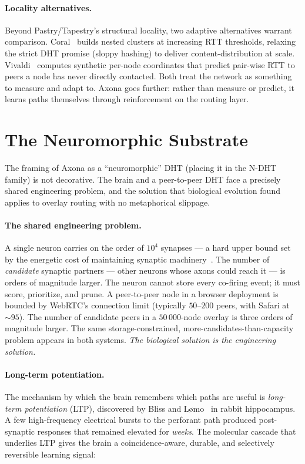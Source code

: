 \documentclass[conference]{IEEEtran}
\newcommand{\axona}{Axona\xspace}
\newcommand{\NDHT}{N-DHT\xspace}
\begin{document}
\paragraph{Locality alternatives.}
Beyond Pastry/Tapestry's structural locality, two adaptive alternatives
warrant comparison. Coral~\cite{freedman2004coral} builds nested clusters
at increasing RTT thresholds, relaxing the strict DHT promise (sloppy
hashing) to deliver content-distribution at scale.
Vivaldi~\cite{dabek2004vivaldi} computes synthetic per-node coordinates
that predict pair-wise RTT to peers a node has never directly contacted.
Both treat the network as something to measure and adapt to. \axona
goes further: rather than measure or predict, it learns paths
themselves through reinforcement on the routing layer.

\section{The Neuromorphic Substrate}
\label{sec:substrate}

The framing of \axona as a ``neuromorphic'' DHT (placing it in the
\NDHT family) is not decorative. The brain and a peer-to-peer DHT face
a precisely shared engineering problem, and the solution that biological
evolution found applies to overlay routing with no metaphorical slippage.

\paragraph{The shared engineering problem.}
A single neuron carries on the order of $10^4$ synapses --- a hard upper
bound set by the energetic cost of maintaining synaptic
machinery~\cite{laughlin2003communication}. The number of \emph{candidate}
synaptic partners --- other neurons whose axons could reach it --- is
orders of magnitude larger. The neuron cannot store every co-firing event;
it must score, prioritize, and prune. A peer-to-peer node in a browser
deployment is bounded by WebRTC's connection limit (typically $50$--$200$
peers, with Safari at $\sim\!95$). The number of candidate peers in a
$50\,000$-node overlay is three orders of magnitude larger. The same
storage-constrained, more-candidates-than-capacity problem appears in
both systems. \emph{The biological solution is the engineering solution.}

\paragraph{Long-term potentiation.}
The mechanism by which the brain remembers which paths are useful is
\emph{long-term potentiation} (LTP), discovered by Bliss and
L\o{}mo~\cite{bliss1973long} in rabbit hippocampus. A few high-frequency
electrical bursts to the perforant path produced post-synaptic responses
that remained elevated for \emph{weeks}. The molecular cascade that
underlies LTP gives the brain a coincidence-aware, durable, and
selectively reversible learning signal:
\end{document}
